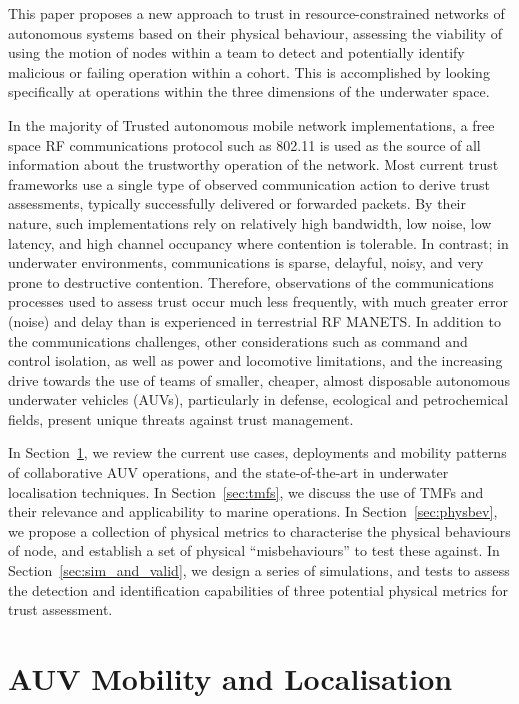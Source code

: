 \documentclass[conference]{IEEEtran}
\begin{document}
This paper proposes a new approach to trust in resource-constrained networks of autonomous systems based on their physical behaviour, assessing the viability of using the motion of nodes within a team to detect and potentially identify malicious or failing operation within a cohort.
This is accomplished by looking specifically at operations within the three dimensions of the underwater space.

In the majority of Trusted autonomous mobile network implementations, a free space RF communications protocol such as 802.11 is used as the source of all information about the trustworthy operation of the network.
Most current trust frameworks use a single type of observed communication action to derive trust assessments, typically successfully delivered or forwarded packets. 
By their nature, such implementations rely on relatively high bandwidth, low noise, low latency, and high channel occupancy where contention is tolerable.
In contrast; in underwater environments, communications is sparse, delayful, noisy, and very prone to destructive contention.
Therefore, observations of the communications processes used to assess trust occur much less frequently, with much greater error (noise) and delay than is experienced in terrestrial RF MANETS.
In addition to the communications challenges, other considerations such as command and control isolation, as well as power and locomotive limitations, and the increasing drive towards the use of teams of smaller, cheaper, almost disposable autonomous underwater vehicles (AUVs), particularly in defense, ecological and petrochemical fields, present unique threats against trust management. 

In Section~\ref{sec:mobility}, we review the current use cases, deployments and mobility patterns of collaborative AUV operations, and the state-of-the-art in underwater localisation techniques.
In Section~\ref{sec:tmfs}, we discuss the use of TMFs and their relevance and applicability to marine operations. 
In Section~\ref{sec:physbev}, we propose a collection of physical metrics to characterise the physical behaviours of node, and establish a set of physical ``misbehaviours'' to test these against.
In Section~\ref{sec:sim_and_valid}, we design a series of simulations, and tests to assess the detection and identification capabilities of three potential physical metrics for trust assessment.


\section{AUV Mobility and Localisation}\label{sec:mobility}
\end{document}
